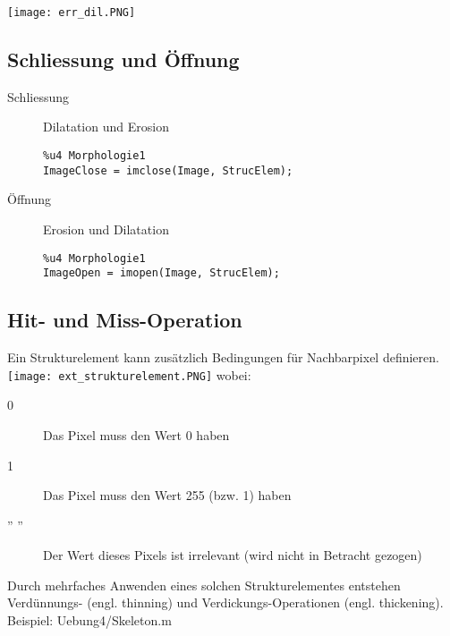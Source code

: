 \texttt{[image: err\_dil.PNG]}

\subsection{Schliessung und Öffnung}
\begin{description}
    \item[Schliessung] Dilatation und Erosion\\
\begin{lstlisting}
%u4 Morphologie1
ImageClose = imclose(Image, StrucElem);
\end{lstlisting}
    \item[Öffnung] Erosion und Dilatation
\begin{lstlisting}
%u4 Morphologie1
ImageOpen = imopen(Image, StrucElem);
\end{lstlisting}
\end{description}

\subsection{Hit- und Miss-Operation}
Ein Strukturelement kann zusätzlich Bedingungen für Nachbarpixel definieren.
\texttt{[image: ext\_strukturelement.PNG]}
wobei:
\begin{description}
    \item[0] Das Pixel muss den Wert 0 haben
    \item[1] Das Pixel muss den Wert 255 (bzw. 1) haben
    \item['' ''] Der Wert dieses Pixels ist irrelevant (wird nicht in Betracht gezogen)
\end{description}
Durch mehrfaches Anwenden eines solchen Strukturelementes entstehen Verdünnungs- (engl. thinning) und Verdickungs-Operationen (engl. thickening).\\
Beispiel: Uebung4/Skeleton.m